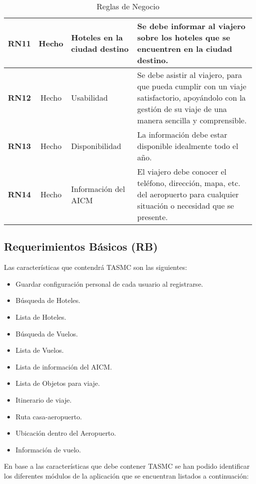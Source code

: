 \begin{table}
\begin{center}
\begin{tabular}{|c|c|p{3cm}|p{5.7cm}|}
			\hline 
				\textbf{RN11} &
				Hecho &
				Hoteles en la ciudad destino &
				Se debe informar al viajero sobre los hoteles que se encuentren en la ciudad destino.  \\ 
			\hline \rowcolor[RGB]{240,248,255}
				\textbf{RN12} &
				Hecho &
				Usabilidad &
				Se debe asistir al viajero, para que pueda cumplir con un viaje satisfactorio, apoyándolo con la gestión de su viaje de una manera sencilla y comprensible.  \\ 
			\hline 
				\textbf{RN13} &
				Hecho &
				Disponibilidad &
				La información debe estar disponible idealmente todo el año.  \\ 
			\hline \rowcolor[RGB]{240,248,255}
				\textbf{RN14} &
				Hecho &
				Información del AICM &
				El viajero debe conocer el teléfono, dirección, mapa, etc. del aeropuerto para cualquier situación o necesidad que se presente. \\ 
			\hline 
		\end{tabular}
	\end{center}
	\caption[Reglas de Negocio]{Reglas de Negocio} 
	\label{tab:reglasNegocio}
\end{table}

\subsection{Requerimientos Básicos (RB)}

Las características que contendrá TASMC son las siguientes:

\begin{itemize}
	\item Guardar configuración personal de cada usuario al registrarse.
	\item Búsqueda de Hoteles.
	\item Lista de Hoteles.
	\item Búsqueda de Vuelos.
	\item Lista de Vuelos.
	\item Lista de información del AICM.
	\item Lista de Objetos para viaje.
	\item Itinerario de viaje.
	\item Ruta casa-aeropuerto.
	\item Ubicación dentro del Aeropuerto.
	\item Información de vuelo.
\end{itemize}

En base a las características que debe contener TASMC se han podido identificar los diferentes módulos de la aplicación que se encuentran listados a continuación:


